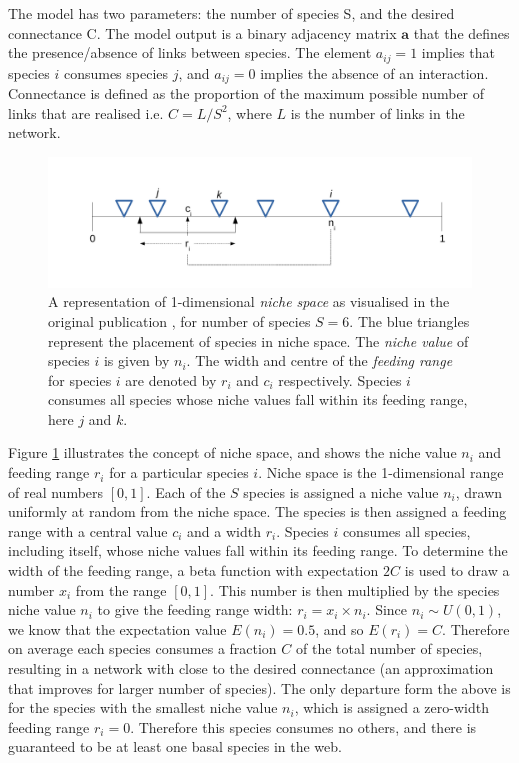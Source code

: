 The model has two parameters: the number of species S, and the desired connectance C. The model output is a binary adjacency matrix $\mathbf{a}$ that the defines the presence/absence of links between species. The element $a_{ij} = 1$ implies that species $i$ consumes species $j$, and $a_{ij} = 0$ implies the absence of an interaction. Connectance is defined as the proportion of the maximum possible number of links that are realised i.e. $C = L/S^2$, where $L$ is the number of links in the network.

\begin{figure}
	\centering
	\includegraphics[width=\textwidth]{"diagrams/niche_space"}
	\caption{A representation of 1-dimensional \emph{niche space} as visualised in the original publication \cite{williams2000simple}, for number of species $S=6$. The blue triangles represent the placement of species in niche space. The \emph{niche value} of species $i$ is given by $n_i$. The width and centre of the \emph{feeding range} for species $i$ are denoted by $r_i$ and $c_i$ respectively. Species $i$ consumes all species whose niche values fall within its feeding range, here $j$ and $k$.}
	\label{fig:niche_model}
\end{figure}


Figure \ref{fig:niche_model} illustrates the concept of niche space, and shows the niche value $n_i$ and feeding range $r_i$ for a particular species $i$. Niche space is the 1-dimensional range of real numbers $[0,1]$. Each of the $S$ species is assigned a niche value $n_i$, drawn uniformly at random from the niche space. The species is then assigned a feeding range with a central value $c_i$ and a width $r_i$. Species $i$ consumes all species, including itself, whose niche values fall within its feeding range. To determine the width of the feeding range, a beta function with expectation $2C$ is used to draw a number $x_i$ from the range $[0,1]$. This number is then multiplied by the species niche value $n_i$ to give the feeding range width: $r_i = x_i \times n_i$.  Since $n_i \sim U(0,1)$, we know that the expectation value $E(n_i) = 0.5$, and so $E(r_i) = C$. Therefore on average each species consumes a fraction $C$ of the total number of species, resulting in a network with close to the desired connectance (an approximation that improves for larger number of species). The only departure form the above is for the species with the smallest niche value $n_i$, which is assigned a zero-width feeding range $r_i = 0$. Therefore this species consumes no others, and there is guaranteed to be at least one basal species in the web.

